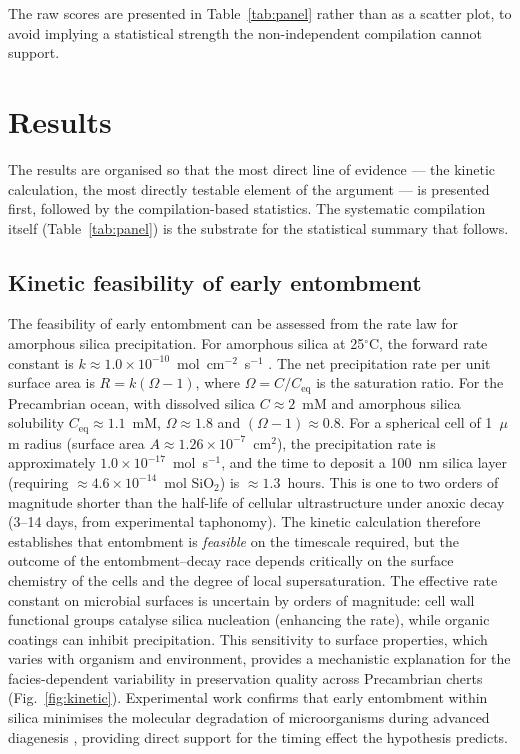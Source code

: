 \documentclass[11pt]{article}
\begin{document}
\noindent The raw scores are presented in Table~\ref{tab:panel} rather than as a scatter plot, to
avoid implying a statistical strength the non-independent compilation cannot support.

\section{Results}

The results are organised so that the most direct line of evidence --- the kinetic calculation,
the most directly testable element of the argument --- is presented first, followed by the
compilation-based statistics. The systematic compilation itself (Table~\ref{tab:panel}) is the
substrate for the statistical summary that follows.

\subsection{Kinetic feasibility of early entombment}

The feasibility of early entombment can be assessed from the rate law for amorphous silica
precipitation. For amorphous silica at 25$^\circ$C, the forward rate constant is
$k \approx 1.0 \times 10^{-10}$~mol~cm$^{-2}$~s$^{-1}$ \citep{Rimstidt1980}. The net precipitation
rate per unit surface area is $R = k(\Omega - 1)$, where $\Omega = C/C_{\mathrm{eq}}$ is the
saturation ratio. For the Precambrian ocean, with dissolved silica $C \approx 2$~mM
\citep{Siever1992} and amorphous silica solubility $C_{\mathrm{eq}} \approx 1.1$~mM,
$\Omega \approx 1.8$ and $(\Omega - 1) \approx 0.8$. For a spherical cell of 1~$\mu$m radius (surface
area $A \approx 1.26 \times 10^{-7}$~cm$^2$), the precipitation rate is approximately
$1.0 \times 10^{-17}$~mol~s$^{-1}$, and the time to deposit a 100~nm silica layer (requiring
$\approx 4.6 \times 10^{-14}$~mol SiO$_2$) is $\approx 1.3$~hours. This is one to two orders of
magnitude shorter than the half-life of cellular ultrastructure under anoxic decay (3--14 days, from
experimental taphonomy). The kinetic calculation therefore establishes that entombment is
\emph{feasible} on the timescale required, but the outcome of the entombment--decay race depends
critically on the surface chemistry of the cells and the degree of local supersaturation. The
effective rate constant on microbial surfaces is uncertain by orders of magnitude: cell wall
functional groups catalyse silica nucleation (enhancing the rate), while organic coatings can inhibit
precipitation. This sensitivity to surface properties, which varies with organism and environment,
provides a mechanistic explanation for the facies-dependent variability in preservation quality
across Precambrian cherts (Fig.~\ref{fig:kinetic}). Experimental work confirms that early entombment
within silica minimises the molecular degradation of microorganisms during advanced diagenesis
\citep{Alleon2016b}, providing direct support for the timing effect the hypothesis predicts.
\end{document}
